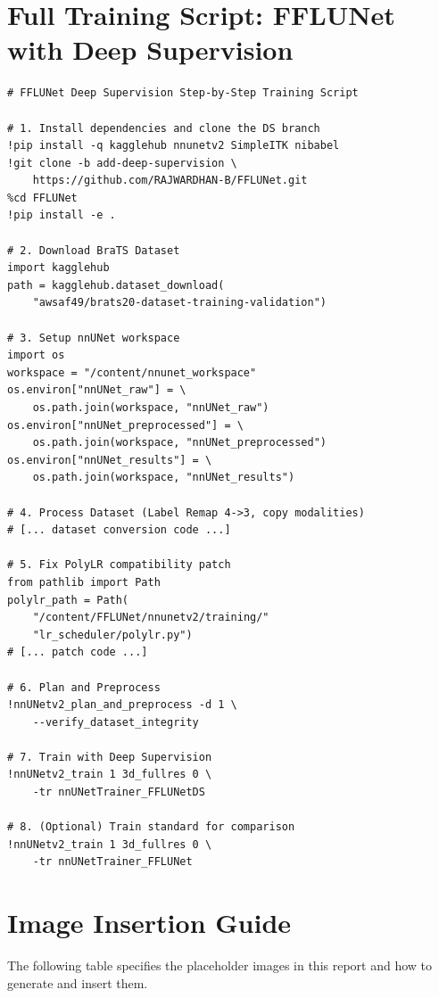 \documentclass[12pt,a4paper]{report}
\begin{document}
\chapter{Full Training Script: FFLUNet with Deep Supervision}

\begin{lstlisting}[caption={Complete clean training script for FFLUNet-DS (\texttt{clean\_brats\_fflunet\_ds.py})}, label={lst:full_ds_script}]
# FFLUNet Deep Supervision Step-by-Step Training Script

# 1. Install dependencies and clone the DS branch
!pip install -q kagglehub nnunetv2 SimpleITK nibabel
!git clone -b add-deep-supervision \
    https://github.com/RAJWARDHAN-B/FFLUNet.git
%cd FFLUNet
!pip install -e .

# 2. Download BraTS Dataset
import kagglehub
path = kagglehub.dataset_download(
    "awsaf49/brats20-dataset-training-validation")

# 3. Setup nnUNet workspace
import os
workspace = "/content/nnunet_workspace"
os.environ["nnUNet_raw"] = \
    os.path.join(workspace, "nnUNet_raw")
os.environ["nnUNet_preprocessed"] = \
    os.path.join(workspace, "nnUNet_preprocessed")
os.environ["nnUNet_results"] = \
    os.path.join(workspace, "nnUNet_results")

# 4. Process Dataset (Label Remap 4->3, copy modalities)
# [... dataset conversion code ...]

# 5. Fix PolyLR compatibility patch
from pathlib import Path
polylr_path = Path(
    "/content/FFLUNet/nnunetv2/training/"
    "lr_scheduler/polylr.py")
# [... patch code ...]

# 6. Plan and Preprocess
!nnUNetv2_plan_and_preprocess -d 1 \
    --verify_dataset_integrity

# 7. Train with Deep Supervision
!nnUNetv2_train 1 3d_fullres 0 \
    -tr nnUNetTrainer_FFLUNetDS

# 8. (Optional) Train standard for comparison
!nnUNetv2_train 1 3d_fullres 0 \
    -tr nnUNetTrainer_FFLUNet
\end{lstlisting}

\chapter{Image Insertion Guide}

The following table specifies the placeholder images in this report and how to generate and insert them.
\end{document}

